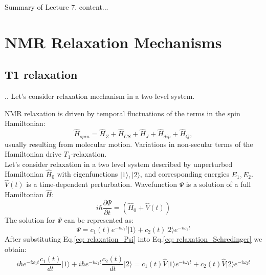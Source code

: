 \documentclass[handout]{beamer}
\begin{document}
\begin{frame}{Summary of Lecture 7.}
	content...
\end{frame}

\section{NMR Relaxation Mechanisms}
\subsection{T1 relaxation}

\begin{frame}{\thesection.\thesubsection. \insertsubsection}
  Let's consider relaxation mechanism in a two level system. 	
	
   NMR relaxation is driven by temporal fluctuations of the terms in the spin Hamiltonian:
   \begin{equation}
     \hat{H}_{spin} = \hat{H}_Z + \hat{H}_{CS} + \hat{H}_J + \hat{H}_{dip} + \hat{H}_Q, 
   \end{equation} 
   usually resulting from molecular motion. Variations in non-secular terms of the Hamiltonian drive $T_1$-relaxation. \\
    Let's consider relaxation in a two level system described by unperturbed Hamiltonian $\hat{H}_0$ with eigenfunctions $\vert 1 \rangle, \vert 2 \rangle$, and corresponding energies $E_1, E_2$. $\hat{V}(t)$ is a time-dependent perturbation. Wavefunction $\Psi$ is a solution of a full Hamiltonian $\hat{H}$:
    \begin{equation} \label{eq: relaxation_Schredinger}
       i\hbar \dfrac{ \partial \Psi}{\partial t} = (\hat{H}_0 + \hat{V}(t))
    \end{equation}
    The solution for $\Psi$ can be represented as:
    \begin{equation} \label{eq: relaxation_Psi}
       \Psi = c_1(t) e^{-i \omega_1 t} \vert 1 \rangle + c_2(t) \vert 2 \rangle e^{-i \omega_2 t}
    \end{equation}
    After substituting Eq.\ref{eq: relaxation_Psi} into Eq.\ref{eq: relaxation_Schredinger} we obtain:
    \begin{align}
       i\hbar e^{-i \omega_1 t} \dfrac{c_1(t)}{d t} \vert 1 \rangle + i\hbar e^{-i \omega_2 t} \dfrac{c_2(t)}{d t} \vert 2 \rangle = c_1(t) \hat{V} \vert 1 \rangle e^{-i \omega_1 t} + c_2(t) \hat{V} \vert 2 \rangle e^{-i \omega_2 t}
    \end{align}
\end{frame}
\end{document}

